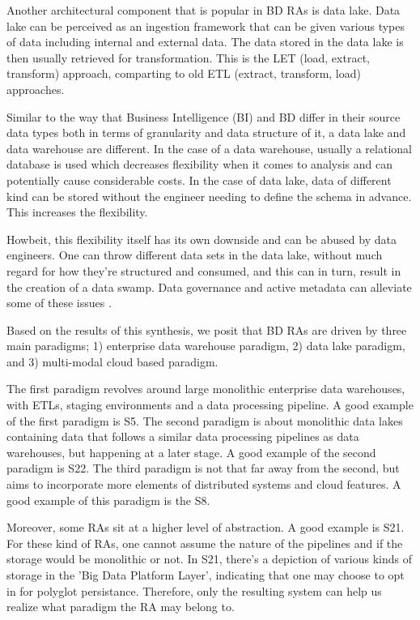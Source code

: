 \documentclass[review]{elsarticle}
\begin{document}
Another architectural component that is popular in BD RAs is data lake. Data lake can be perceived as an ingestion framework that can be given various types of data including internal and external data. The data stored in the data lake is then usually retrieved for transformation. This is the LET (load, extract, transform) approach, comparting to old ETL (extract, transform, load) approaches. 

Similar to the way that Business Intelligence (BI) and BD differ in their source data types both in terms of granularity and data structure of it, a data lake and data warehouse are different. In the case of a data warehouse, usually a relational database is used which decreases flexibility when it comes to analysis and can potentially cause considerable costs. In the case of data lake, data of different kind can be stored without the engineer needing to define the schema in advance. This increases the flexibility.

Howbeit, this flexibility itself has its own downside and can be abused by data engineers. One can throw different data sets in the data lake, without much regard for how they’re structured and consumed, and this can in turn, result in the creation of a data swamp. Data governance and active metadata can alleviate some of these issues \cite{monolithToMesh}.

Based on the results of this synthesis, we posit that BD RAs are driven by three main paradigms; 1) enterprise data warehouse paradigm, 2) data lake paradigm, and 3) multi-modal cloud based paradigm. 

The first paradigm revolves around large monolithic enterprise data warehouses, with ETLs, staging environments and a data processing pipeline. A good example of the first paradigm is S5. The second paradigm is about monolithic data lakes containing data that follows a similar data processing pipelines as data warehouses, but happening at a later stage. A good example of the second paradigm is S22. The third paradigm is not that far away from the second, but aims to incorporate more elements of distributed systems and cloud features. A good example of this paradigm is the S8.

Moreover, some RAs sit at a higher level of abstraction. A good example is S21. For these kind of RAs, one cannot assume the nature of the pipelines and if the storage would be monolithic or not. In S21, there's a depiction of various kinds of storage in the 'Big Data Platform Layer', indicating that one may choose to opt in for polyglot persistance. Therefore, only the resulting system can help us realize what paradigm the RA may belong to. 
\end{document}
